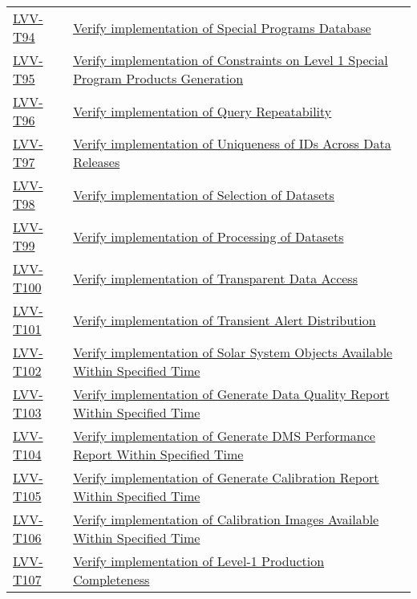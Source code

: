 \begin{longtable}[]{p{3cm}p{13cm}}
    \hyperref[lvv-t94]{LVV-T94} &
    \href{https://jira.lsstcorp.org/secure/Tests.jspa\#/testCase/LVV-T94}{Verify implementation of Special Programs Database} \tabularnewline
    \hyperref[lvv-t95]{LVV-T95} &
    \href{https://jira.lsstcorp.org/secure/Tests.jspa\#/testCase/LVV-T95}{Verify implementation of Constraints on Level 1 Special Program Products Generation} \tabularnewline
    \hyperref[lvv-t96]{LVV-T96} &
    \href{https://jira.lsstcorp.org/secure/Tests.jspa\#/testCase/LVV-T96}{Verify implementation of Query Repeatability} \tabularnewline
    \hyperref[lvv-t97]{LVV-T97} &
    \href{https://jira.lsstcorp.org/secure/Tests.jspa\#/testCase/LVV-T97}{Verify implementation of Uniqueness of IDs Across Data Releases} \tabularnewline
    \hyperref[lvv-t98]{LVV-T98} &
    \href{https://jira.lsstcorp.org/secure/Tests.jspa\#/testCase/LVV-T98}{Verify implementation of Selection of Datasets} \tabularnewline
    \hyperref[lvv-t99]{LVV-T99} &
    \href{https://jira.lsstcorp.org/secure/Tests.jspa\#/testCase/LVV-T99}{Verify implementation of Processing of Datasets} \tabularnewline
    \hyperref[lvv-t100]{LVV-T100} &
    \href{https://jira.lsstcorp.org/secure/Tests.jspa\#/testCase/LVV-T100}{Verify implementation of Transparent Data Access} \tabularnewline
    \hyperref[lvv-t101]{LVV-T101} &
    \href{https://jira.lsstcorp.org/secure/Tests.jspa\#/testCase/LVV-T101}{Verify implementation of Transient Alert Distribution} \tabularnewline
    \hyperref[lvv-t102]{LVV-T102} &
    \href{https://jira.lsstcorp.org/secure/Tests.jspa\#/testCase/LVV-T102}{Verify implementation of Solar System Objects Available Within Specified Time} \tabularnewline
    \hyperref[lvv-t103]{LVV-T103} &
    \href{https://jira.lsstcorp.org/secure/Tests.jspa\#/testCase/LVV-T103}{Verify implementation of Generate Data Quality Report Within Specified Time} \tabularnewline
    \hyperref[lvv-t104]{LVV-T104} &
    \href{https://jira.lsstcorp.org/secure/Tests.jspa\#/testCase/LVV-T104}{Verify implementation of Generate DMS Performance Report Within Specified Time} \tabularnewline
    \hyperref[lvv-t105]{LVV-T105} &
    \href{https://jira.lsstcorp.org/secure/Tests.jspa\#/testCase/LVV-T105}{Verify implementation of Generate Calibration Report Within Specified Time} \tabularnewline
    \hyperref[lvv-t106]{LVV-T106} &
    \href{https://jira.lsstcorp.org/secure/Tests.jspa\#/testCase/LVV-T106}{Verify implementation of Calibration Images Available Within Specified Time} \tabularnewline
    \hyperref[lvv-t107]{LVV-T107} &
    \href{https://jira.lsstcorp.org/secure/Tests.jspa\#/testCase/LVV-T107}{Verify implementation of Level-1 Production Completeness} \tabularnewline

\end{longtable}
